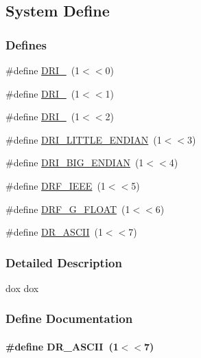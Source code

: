 \subsection{System Define}
\label{group__msdefineh}
\subsubsection*{Defines}
\begin{DoxyCompactItemize}
\item 
\#define \hyperlink{group__msdefineh_ga6f24d57769829c6f7ba50fb583a6145a}{DRI\_}~(1$<$$<$0)
\item 
\#define \hyperlink{group__msdefineh_ga23c1be975c22d964171147278528ec8a}{DRI\_}~(1$<$$<$1)
\item 
\#define \hyperlink{group__msdefineh_gab190dd0e5439f0688e15c8b5312a7e4f}{DRI\_}~(1$<$$<$2)
\item 
\#define \hyperlink{group__msdefineh_ga488afc1213500e60d6dd9a2939fb3204}{DRI\_\-LITTLE\_\-ENDIAN}~(1$<$$<$3)
\item 
\#define \hyperlink{group__msdefineh_gab3ef6d21655a8a91a2fbc6866ae42823}{DRI\_\-BIG\_\-ENDIAN}~(1$<$$<$4)
\item 
\#define \hyperlink{group__msdefineh_gacf6c5a8ba75600af57eaab22a9e6f4a5}{DRF\_\-IEEE}~(1$<$$<$5)
\item 
\#define \hyperlink{group__msdefineh_ga4ad501f5c59d4db17df10859e7ee97de}{DRF\_\-G\_\-FLOAT}~(1$<$$<$6)
\item 
\#define \hyperlink{group__msdefineh_ga0fd6c5fc5e2431d0fc11fc9ca12c6baa}{DR\_\-ASCII}~(1$<$$<$7)
\end{DoxyCompactItemize}


\subsubsection{Detailed Description}
dox dox 

\subsubsection{Define Documentation}
\paragraph[{DR\_\-ASCII}]{\setlength{\rightskip}{0pt plus 5cm}\#define DR\_\-ASCII~(1$<$$<$7)}\hfill\label{group__msdefineh_ga0fd6c5fc5e2431d0fc11fc9ca12c6baa}

